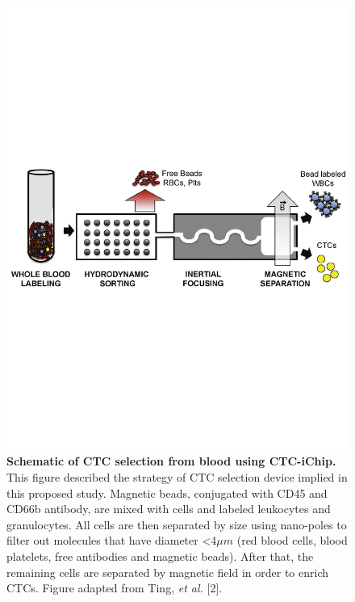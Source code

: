 \documentclass[11pts]{article}
\begin{document}
\begin{figure}
\includegraphics[width=1\textwidth]{ichip.pdf}
\caption{\small {\bf Schematic of CTC selection from blood using CTC-iChip. } This figure described the strategy of CTC selection device implied in this proposed study. Magnetic beads, conjugated with CD45 and CD66b antibody, are mixed with cells and labeled leukocytes and granulocytes. All cells are then separated by size using nano-poles to filter out molecules that have diameter \textless 4$\mu m$ (red blood cells, blood platelets, free antibodies and magnetic beads). After that, the remaining cells are separated by magnetic field in order to enrich CTCs. Figure adapted from Ting, {\it et al.} [2]. } 
\end{figure} 
\end{document}
